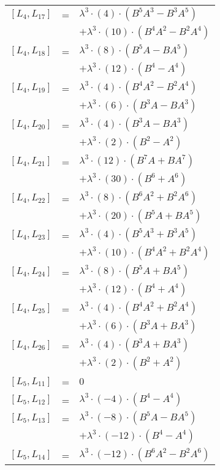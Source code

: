 \documentclass{article}
\begin{document}
\begin{center}
\begin{longtable}{lll}
$[L_{4},L_{17}]$ & = & ${\lambda}^3{\cdot}(4){\cdot}(B^{5}A^{3}-B^{3}A^{5})$ \\*
 & & $ + {\lambda}^3{\cdot}(10){\cdot}(B^{4}A^{2}-B^{2}A^{4})$ \\
$[L_{4},L_{18}]$ & = & ${\lambda}^3{\cdot}(8){\cdot}(B^{5}A-BA^{5})$ \\*
 & & $ + {\lambda}^3{\cdot}(12){\cdot}(B^{4}-A^{4})$ \\
$[L_{4},L_{19}]$ & = & ${\lambda}^3{\cdot}(4){\cdot}(B^{4}A^{2}-B^{2}A^{4})$ \\*
 & & $ + {\lambda}^3{\cdot}(6){\cdot}(B^{3}A-BA^{3})$ \\
$[L_{4},L_{20}]$ & = & ${\lambda}^3{\cdot}(4){\cdot}(B^{3}A-BA^{3})$ \\*
 & & $ + {\lambda}^3{\cdot}(2){\cdot}(B^{2}-A^{2})$ \\
$[L_{4},L_{21}]$ & = & ${\lambda}^3{\cdot}(12){\cdot}(B^{7}A+BA^{7})$ \\*
 & & $ + {\lambda}^3{\cdot}(30){\cdot}(B^{6}+A^{6})$ \\
$[L_{4},L_{22}]$ & = & ${\lambda}^3{\cdot}(8){\cdot}(B^{6}A^{2}+B^{2}A^{6})$ \\*
 & & $ + {\lambda}^3{\cdot}(20){\cdot}(B^{5}A+BA^{5})$ \\
$[L_{4},L_{23}]$ & = & ${\lambda}^3{\cdot}(4){\cdot}(B^{5}A^{3}+B^{3}A^{5})$ \\*
 & & $ + {\lambda}^3{\cdot}(10){\cdot}(B^{4}A^{2}+B^{2}A^{4})$ \\
$[L_{4},L_{24}]$ & = & ${\lambda}^3{\cdot}(8){\cdot}(B^{5}A+BA^{5})$ \\*
 & & $ + {\lambda}^3{\cdot}(12){\cdot}(B^{4}+A^{4})$ \\
$[L_{4},L_{25}]$ & = & ${\lambda}^3{\cdot}(4){\cdot}(B^{4}A^{2}+B^{2}A^{4})$ \\*
 & & $ + {\lambda}^3{\cdot}(6){\cdot}(B^{3}A+BA^{3})$ \\
$[L_{4},L_{26}]$ & = & ${\lambda}^3{\cdot}(4){\cdot}(B^{3}A+BA^{3})$ \\*
 & & $ + {\lambda}^3{\cdot}(2){\cdot}(B^{2}+A^{2})$ \\
$[L_{5},L_{11}]$ & = & $ 0 $ \\
$[L_{5},L_{12}]$ & = & ${\lambda}^3{\cdot}(-4){\cdot}(B^{4}-A^{4})$ \\
$[L_{5},L_{13}]$ & = & ${\lambda}^3{\cdot}(-8){\cdot}(B^{5}A-BA^{5})$ \\*
 & & $ + {\lambda}^3{\cdot}(-12){\cdot}(B^{4}-A^{4})$ \\
$[L_{5},L_{14}]$ & = & ${\lambda}^3{\cdot}(-12){\cdot}(B^{6}A^{2}-B^{2}A^{6})$ \\*

\end{longtable}
\end{center}
\end{document}
